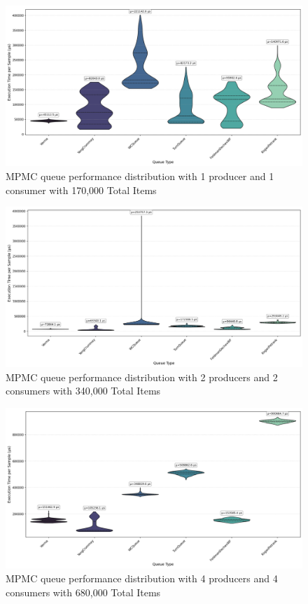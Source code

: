 \begin{figure}[H]
\centering
\caption{MPMC queue performance distribution with 1 producer and 1 consumer with 170,000 Total Items}
\label{fig:mpmc-violin-1p1c}
\includegraphics[width=\textwidth]{images/results/mpmc_performance_violin_1P_1C.png}
\end{figure}

\begin{figure}[H]
\centering
\caption{MPMC queue performance distribution with 2 producers and 2 consumers with 340,000 Total Items}
\label{fig:mpmc-violin-2p2c}
\includegraphics[width=\textwidth]{images/results/mpmc_performance_violin_2P_2C.png}
\end{figure}

\begin{figure}[H]
\centering
\caption{MPMC queue performance distribution with 4 producers and 4 consumers with 680,000 Total Items}
\label{fig:mpmc-violin-4p4c}
\includegraphics[width=\textwidth]{images/results/mpmc_performance_violin_4P_4C.png}
\end{figure}

